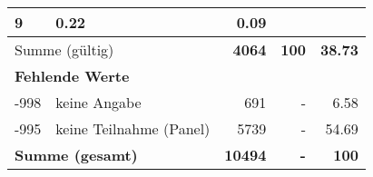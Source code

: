 \begin{longtable}{lXrrr}
       \num{9} &
       \num[round-mode=places,round-precision=2]{0,22} &
         \num[round-mode=places,round-precision=2]{0,09} \\
     \midrule
     \multicolumn{2}{l}{Summe (gültig)} &
       \textbf{\num{4064}} &
     \textbf{100} &
       \textbf{\num[round-mode=places,round-precision=2]{38,73}} \\
     \multicolumn{5}{l}{\textbf{Fehlende Werte}}\\
       -998 &
       keine Angabe &
         \num{691} &
        - &
         \num[round-mode=places,round-precision=2]{6,58} \\
       -995 &
       keine Teilnahme (Panel) &
         \num{5739} &
        - &
         \num[round-mode=places,round-precision=2]{54,69} \\
     \midrule
     \multicolumn{2}{l}{\textbf{Summe (gesamt)}} &
          \textbf{\num{10494}} &
        \textbf{-} &
        \textbf{100} \\
     \bottomrule
     \end{longtable}
     
